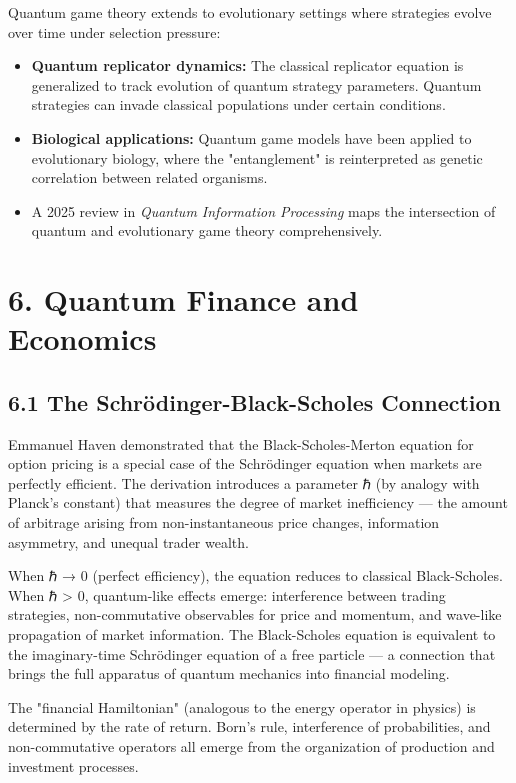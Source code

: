 \documentclass[11pt]{article}
\begin{document}
Quantum game theory extends to evolutionary settings where strategies evolve
over time under selection pressure:

\begin{itemize}
\item \textbf{Quantum replicator dynamics:} The classical replicator equation is generalized
to track evolution of quantum strategy parameters. Quantum strategies can
invade classical populations under certain conditions.
\item \textbf{Biological applications:} Quantum game models have been applied to evolutionary
biology, where the "entanglement" is reinterpreted as genetic correlation
between related organisms.
\item A 2025 review in \emph{Quantum Information Processing} maps the intersection of
quantum and evolutionary game theory comprehensively.
\end{itemize}
\section{6. Quantum Finance and Economics}
\label{sec:org1525abd}

\subsection{6.1 The Schrödinger-Black-Scholes Connection}
\label{sec:org164ac0d}

Emmanuel Haven demonstrated that the Black-Scholes-Merton equation for option
pricing is a special case of the Schrödinger equation when markets are perfectly
efficient. The derivation introduces a parameter ℏ (by analogy with Planck's
constant) that measures the degree of market inefficiency --- the amount of
arbitrage arising from non-instantaneous price changes, information asymmetry,
and unequal trader wealth.

When ℏ → 0 (perfect efficiency), the equation reduces to classical Black-Scholes.
When ℏ > 0, quantum-like effects emerge: interference between trading strategies,
non-commutative observables for price and momentum, and wave-like propagation of
market information. The Black-Scholes equation is equivalent to the imaginary-time
Schrödinger equation of a free particle --- a connection that brings the full
apparatus of quantum mechanics into financial modeling.

The "financial Hamiltonian" (analogous to the energy operator in physics) is
determined by the rate of return. Born's rule, interference of probabilities, and
non-commutative operators all emerge from the organization of production and
investment processes.
\end{document}
